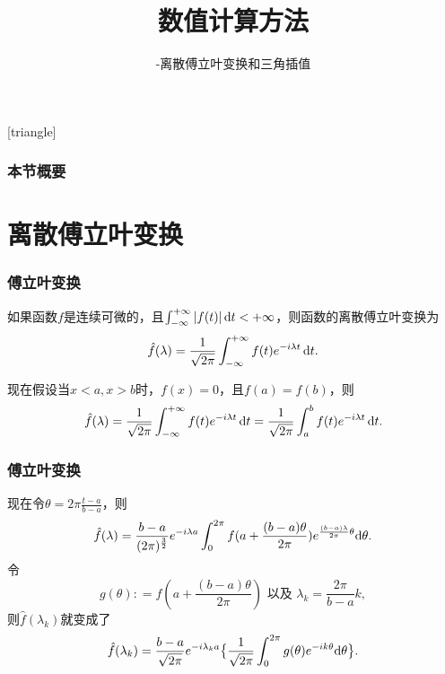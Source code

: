 \documentclass[10pt]{beamer}
\title[数值计算方法]{数值计算方法}
\subtitle{-离散傅立叶变换和三角插值}
\def\dt{\,{\rm d}t}
\def\dd{{\rm d}}
\begin{document}
[triangle]

\begin{frame}
\titlepage
\end{frame}


\begin{frame}
  \frametitle{本节概要}
  \tableofcontents%
\end{frame}

\section{离散傅立叶变换}

\begin{frame}
\frametitle{傅立叶变换}
\begin{definition}[傅立叶变换]
如果函数$f$是连续可微的，且$\int_{-\infty}^{+\infty} |f(t)| \dt < +\infty$，则函数的离散傅立叶变换为
\begin{equation}
\hat{f}(\lambda) = \frac{1}{\sqrt{2\pi}}\int_{-\infty}^{+\infty} f(t) e^{-i \lambda t} \dt.
\end{equation}
\end{definition}
现在假设当$x<a, x>b$时，$f(x) = 0$，且$f(a) = f(b)$，则
\begin{equation}
\hat{f}(\lambda)= \frac{1}{\sqrt{2\pi}}\int_{-\infty}^{+\infty} f(t) e^{-i \lambda t} \dt =  \frac{1}{\sqrt{2\pi}}\int_{a}^{b} f(t) e^{-i \lambda t} \dt.
\end{equation}
\end{frame}


\begin{frame}
\frametitle{傅立叶变换}
现在令$\theta = 2\pi\frac{t-a}{b-a}$，则
\begin{equation}
\hat{f}(\lambda)= \frac{b-a}{(2\pi)^{\frac{3}{2}}} e^{-i \lambda a} \int_0^{2\pi} f(a + \frac{(b-a) \theta}{2\pi}) e^{\frac{(b-a) \lambda}{2\pi}\theta} \dd \theta.
\end{equation}
令
\begin{equation}
g(\theta) : =  f(a + \frac{(b-a) \theta}{2\pi}) \text{ 以及 } \lambda_k = \frac{2\pi}{b-a} k,
\end{equation}
则$\hat{f}(\lambda_k)$就变成了
\begin{equation}
\hat{f}(\lambda_k) = \frac{b-a}{\sqrt{2\pi}} e^{-i \lambda_k a} \big\{ \frac{1}{\sqrt{2\pi}} \int_0^{2\pi} g(\theta) e^{-i k \theta} \dd \theta \big\}.
\end{equation}
\end{frame}
\end{document}
